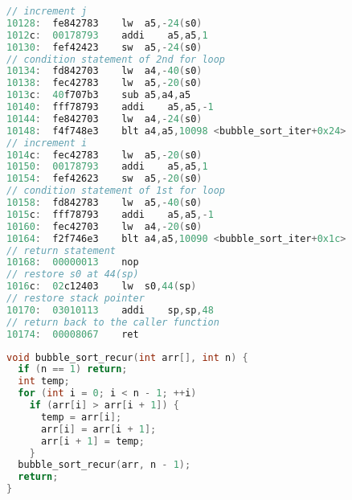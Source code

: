 \documentclass[
    a4paper,
    oneside,
    adjustmath,
    finemath,
    itemph,
    nonfrench,
    11pt
]{oblivoir}
\begin{document}
\begin{lstlisting}[language=C, caption=Iterative bubble sort in RV32I]
// increment j
10128:	fe842783	lw	a5,-24(s0)
1012c:	00178793	addi	a5,a5,1
10130:	fef42423	sw	a5,-24(s0)
// condition statement of 2nd for loop
10134:	fd842703	lw	a4,-40(s0)
10138:	fec42783	lw	a5,-20(s0)
1013c:	40f707b3	sub	a5,a4,a5
10140:	fff78793	addi	a5,a5,-1
10144:	fe842703	lw	a4,-24(s0)
10148:	f4f748e3	blt	a4,a5,10098 <bubble_sort_iter+0x24>
// increment i
1014c:	fec42783	lw	a5,-20(s0)
10150:	00178793	addi	a5,a5,1
10154:	fef42623	sw	a5,-20(s0)
// condition statement of 1st for loop
10158:	fd842783	lw	a5,-40(s0)
1015c:	fff78793	addi	a5,a5,-1
10160:	fec42703	lw	a4,-20(s0)
10164:	f2f746e3	blt	a4,a5,10090 <bubble_sort_iter+0x1c>
// return statement
10168:	00000013	nop
// restore s0 at 44(sp)
1016c:	02c12403	lw	s0,44(sp)
// restore stack pointer
10170:	03010113	addi	sp,sp,48
// return back to the caller function
10174:	00008067	ret
    \end{lstlisting}
    \begin{lstlisting}[language=C, caption=Recursive bubble sort in C]
void bubble_sort_recur(int arr[], int n) {
  if (n == 1) return;
  int temp;
  for (int i = 0; i < n - 1; ++i)
    if (arr[i] > arr[i + 1]) {
      temp = arr[i];
      arr[i] = arr[i + 1];
      arr[i + 1] = temp;
    }
  bubble_sort_recur(arr, n - 1);
  return;
}
    \end{lstlisting}
\end{document}
